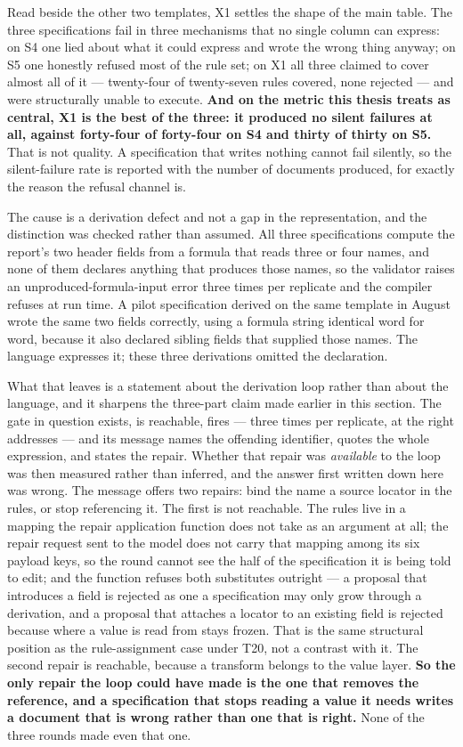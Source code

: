 Read beside the other two templates, X1 settles the shape of the main table. The three
specifications fail in three mechanisms that no single column can express: on S4 one lied about
what it could express and wrote the wrong thing anyway; on S5 one honestly refused most of the
rule set; on X1 all three claimed to cover almost all of it --- twenty-four of twenty-seven rules
covered, none rejected --- and were structurally unable to execute. \textbf{And on the metric this
thesis treats as central, X1 is the best of the three: it produced no silent failures at all,
against forty-four of forty-four on S4 and thirty of thirty on S5.} That is not quality. A
specification that writes nothing cannot fail silently, so the silent-failure rate is reported
with the number of documents produced, for exactly the reason the refusal channel is.

The cause is a derivation defect and not a gap in the representation, and the distinction was
checked rather than assumed. All three specifications compute the report's two header fields from
a formula that reads three or four names, and none of them declares anything that produces those
names, so the validator raises an unproduced-formula-input error three times per replicate and the
compiler refuses at run time. A pilot specification derived on the same template in August wrote
the same two fields correctly, using a formula string identical word for word, because it also
declared sibling fields that supplied those names. The language expresses it; these three
derivations omitted the declaration.

What that leaves is a statement about the derivation loop rather than about the language, and it
sharpens the three-part claim made earlier in this section. The gate in question exists, is
reachable, fires --- three times per replicate, at the right addresses --- and its message names
the offending identifier, quotes the whole expression, and states the repair. Whether that repair
was \emph{available} to the loop was then measured rather than inferred, and the answer first
written down here was wrong. The message offers two repairs: bind the name a source locator in
the rules, or stop referencing it. The first is not reachable. The rules live in a mapping the
repair application function does not take as an argument at all; the repair request sent to the
model does not carry that mapping among its six payload keys, so the round cannot see the half
of the specification it is being told to edit; and the function refuses both substitutes
outright --- a proposal that introduces a field is rejected as one a specification may only grow
through a derivation, and a proposal that attaches a locator to an existing field is rejected
because where a value is read from stays frozen. That is the same structural position as the
rule-assignment case under T20, not a contrast with it. The second repair is reachable, because
a transform belongs to the value layer. \textbf{So the only repair the loop could have made is
the one that removes the reference, and a specification that stops reading a value it needs
writes a document that is wrong rather than one that is right.} None of the three rounds made
even that one.

